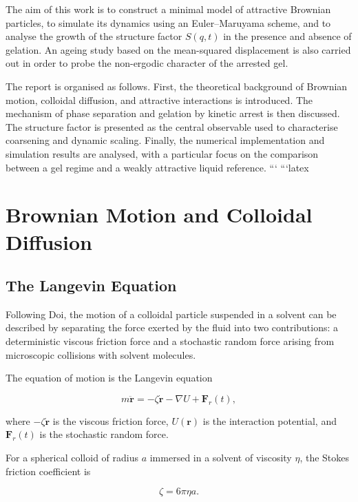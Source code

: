 \documentclass[11pt,a4paper]{article}
\begin{document}
The aim of this work is to construct a minimal model of attractive Brownian particles, to simulate its dynamics using an Euler--Maruyama scheme, and to analyse the growth of the structure factor $S(q,t)$ in the presence and absence of gelation. An ageing study based on the mean-squared displacement is also carried out in order to probe the non-ergodic character of the arrested gel.

The report is organised as follows. First, the theoretical background of Brownian motion, colloidal diffusion, and attractive interactions is introduced. The mechanism of phase separation and gelation by kinetic arrest is then discussed. The structure factor is presented as the central observable used to characterise coarsening and dynamic scaling. Finally, the numerical implementation and simulation results are analysed, with a particular focus on the comparison between a gel regime and a weakly attractive liquid reference.
```
```latex
\section{Brownian Motion and Colloidal Diffusion}

\subsection{The Langevin Equation}

Following Doi, the motion of a colloidal particle suspended in a solvent can be described by separating the force exerted by the fluid into two contributions: a deterministic viscous friction force and a stochastic random force arising from microscopic collisions with solvent molecules.

The equation of motion is the Langevin equation

\begin{equation}
m\ddot{\mathbf r}
=
-\zeta \dot{\mathbf r}
-\nabla U
+
\mathbf F_r(t),
\label{eq:langevin}
\end{equation}

where $-\zeta \dot{\mathbf r}$ is the viscous friction force, $U(\mathbf r)$ is the interaction potential, and $\mathbf F_r(t)$ is the stochastic random force.

For a spherical colloid of radius $a$ immersed in a solvent of viscosity $\eta$, the Stokes friction coefficient is

\begin{equation}
\zeta = 6\pi \eta a.
\end{equation}
\end{document}
